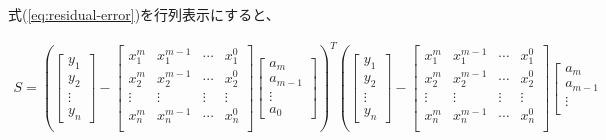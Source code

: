 \documentclass[titlepage]{jsreport}
\begin{document}
{{{式(\ref{eq:residual-error})を行列表示にすると、

\footnotesize
\begin{eqnarray}
S = \left(
        \left[
            \begin{array}{c}
            y_1\\
            y_2\\
            \vdots\\
            y_n
            \end{array}
        \right]
        -
        \left[
            \begin{array}{cccc}
            x_1^m & x_1^{m-1} & \cdots & x_1^0 \\
            x_2^m & x_2^{m-1} & \cdots & x_2^0 \\
            \vdots & \vdots & \vdots & \vdots\\
            x_n^m & x_n^{m-1} & \cdots & x_n^0 \\
            \end{array}
        \right]
        \left[
            \begin{array}{c}
            a_m\\
            a_{m-1}\\
            \vdots\\
            a_0
            \end{array}
        \right]
    \right)^T
    \left(
        \left[
            \begin{array}{c}
            y_1\\
            y_2\\
            \vdots\\
            y_n
            \end{array}
        \right]
        -
        \left[
            \begin{array}{cccc}
            x_1^m & x_1^{m-1} & \cdots & x_1^0 \\
            x_2^m & x_2^{m-1} & \cdots & x_2^0 \\
            \vdots & \vdots & \vdots & \vdots\\
            x_n^m & x_n^{m-1} & \cdots & x_n^0 \\
            \end{array}
        \right]
        \left[
            \begin{array}{c}
            a_m\\
            a_{m-1}\\
            \vdots\\

\end{array}
\end{eqnarray}}}}
\end{document}
